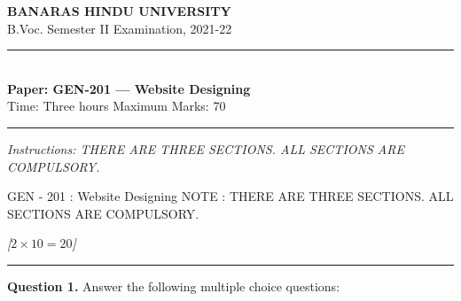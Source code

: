 \documentclass[11pt,a4paper]{article}
\newcommand{\pts}[1]{\hfill   \textit{[#1]}}
\begin{document}
\begin{center}
  {\large\bfseries BANARAS HINDU UNIVERSITY}\\[2pt]
  {\normalsize B.Voc. Semester II Examination, 2021-22}\\[6pt]
  \rule{0.8\linewidth}{0.5pt}\\[6pt]
  {\large\bfseries Paper: GEN-201 --- Website Designing}\\[4pt]
  {\normalsize Time: Three hours \hfill Maximum Marks: 70}
\end{center}

\rule{\linewidth}{0.4pt}

\smallskip



\noindent   \textit{Instructions: THERE ARE THREE SECTIONS. ALL SECTIONS ARE COMPULSORY.}

\bigskip

GEN - 201 : Website Designing
NOTE : THERE ARE THREE SECTIONS. ALL SECTIONS ARE COMPULSORY.

\bigskip


\pts{$2  \times 10 = 20$}
\rule{\linewidth}{0.4pt}\smallskip

\medskip


\noindent   \textbf{Question 1.} Answer the following multiple choice questions:
\end{document}
